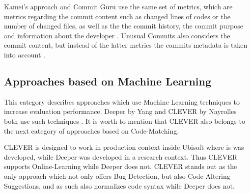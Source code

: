 Kamei's approach and Commit Guru use the same set of metrics, which are metrics regarding the commit content such as changed lines of codes or the number of changed files, as well as the the commit history, the commit purpose and information about the developer \cite{Rosen2015,Kamei2013}. Unusual Commits also considers the commit content, but instead of the latter metrics the commits metadata is taken into account \cite{Goyal2017}.



\subsection{Approaches based on Machine Learning}


This category describes approaches which use Machine Learning techniques to increase evaluation performance. Deeper by Yang and CLEVER by Nayrolles both use such techniques \cite{Nayrolles2018, Yang2015}. It is worth to mention that CLEVER also belongs to the next category of approaches based on Code-Matching.

CLEVER is designed to work in production context inside Ubisoft where is was developed, while Deeper was developed in a research context. Thus CLEVER supports Online-Learning while Deeper does not. CLEVER stands out as the only approach which not only offers Bug Detection, but also Code Altering Suggestions, and as such also normalizes code syntax while Deeper does not. \cite{Nayrolles2018, Yang2015}

